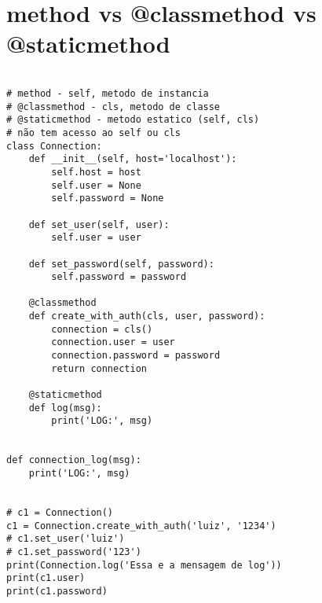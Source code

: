 \documentclass{article}
\begin{document}
\section{  method vs @classmethod vs @staticmethod}
\begin{lstlisting}
    
# method - self, metodo de instancia
# @classmethod - cls, metodo de classe
# @staticmethod - metodo estatico (self, cls)
# não tem acesso ao self ou cls
class Connection:
    def __init__(self, host='localhost'):
        self.host = host
        self.user = None
        self.password = None

    def set_user(self, user):
        self.user = user

    def set_password(self, password):
        self.password = password

    @classmethod
    def create_with_auth(cls, user, password):
        connection = cls()
        connection.user = user
        connection.password = password
        return connection

    @staticmethod
    def log(msg):
        print('LOG:', msg)


def connection_log(msg):
    print('LOG:', msg)


# c1 = Connection()
c1 = Connection.create_with_auth('luiz', '1234')
# c1.set_user('luiz')
# c1.set_password('123')
print(Connection.log('Essa e a mensagem de log'))
print(c1.user)
print(c1.password)
    
\end{lstlisting}
\end{document}
